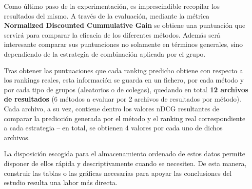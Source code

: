 Como último paso de la experimentación, es imprescindible recopilar los resultados del mismo. A través de la evaluación, mediante la métrica \textbf{Normalized Discounted Cummulative Gain} se obtiene una puntuación que servirá para comparar la eficacia de los diferentes métodos. Además será interesante comparar sus puntuaciones no solamente en términos generales, sino dependiendo de la estrategia de combinación aplicada por el grupo.

Tras obtener las puntuaciones que cada ranking predicho obtiene con respecto a los rankings reales, esta información se guarda en un fichero, por cada método y por cada tipo de grupos (aleatorios o de colegas), quedando en total \textbf{12 archivos de resultados} (6 métodos a evaluar por 2 archivos de resultados por método). Cada archivo, a su vez, contiene dentro los valores nDCG resultantes de comparar la predicción generada por el método y el ranking real correspondiente a cada estrategia -- en total, se obtienen 4 valores por cada uno de dichos archivos.

La disposición escogida para el almacenamiento ordenado de estos datos permite disponer de ellos rápida y descriptivamente cuando se necesiten. De esta manera, construir las tablas o las gráficas necesarias para apoyar las conclusiones del estudio resulta una labor más directa.


